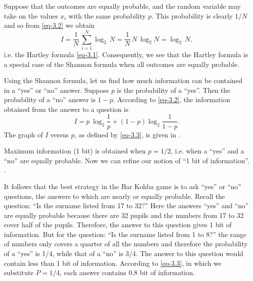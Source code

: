Suppose that the outcomes are equally probable, and the random
variable may take on the values $x_{i}$ with the same probability $p$. This
probability is clearly $1/N$ and so from \eqref{eq-3.2} we obtain
\begin{equation*}%
I =  \frac{1}{N} \, \sum_{i=1}^{N}   \log_{2} \, N = \frac{1}{N} \, N \,  \log_{2} N =   \log_{2} \, N,
\end{equation*}
i.e. the Hartley formula \eqref{eq-3.1}. Consequently, we see that the Hartley formula is a special case of the Shannon formula when all outcomes are
equally probable.

Using the Shannon formula, let us find how much information can be
contained in a ``yes'' or ``no'' answer. Suppose $p$ is the probability of
a ``yes''. Then the probability of a ``no'' answer is $1 - p$. According to
\eqref{eq-3.2}, the information obtained from the answer to a question is
\begin{equation}%
I = p \ \log_{2}  \frac{1}{p} + (1 - p)   \log_{2} \frac{1}{1-p}.
\label{eq-3.3}
\end{equation}
The graph of $I$ versus $p$, as defined by \eqref{eq-3.3}, is given in .


Maximum information (1 bit) is obtained when $p = 1/2$, i.e. when
a ``yes'' and a ``no'' are equally probable. Now we can refine our notion
of ``1 bit of information''. .

It follows that the best strategy in the Bar Kohba game is to ask
``yes'' or ``no'' questions, the answers to which are nearly or equally
probable. Recall the question: ``Is the surname listed from 17 to 32?''
Here the answers ``yes'' and ``no'' are equally probable because there are
32 pupils and the numbers from 17 to 32 cover half of the pupils. Therefore,
the answer to this question gives 1 bit of information. But for the
question: ``Is the surname listed from 1 to 8?'' the range of numbers
only covers a quarter of all the numbers and therefore the probability of
a ``yes'' is 1/4, while that of a ``no'' is 3/4. The answer to this question
would contain less than 1 bit of information. According to \eqref{eq-3.3}, in which we substitute $P = 1/4$, each answer contains 0.8 bit of information.


